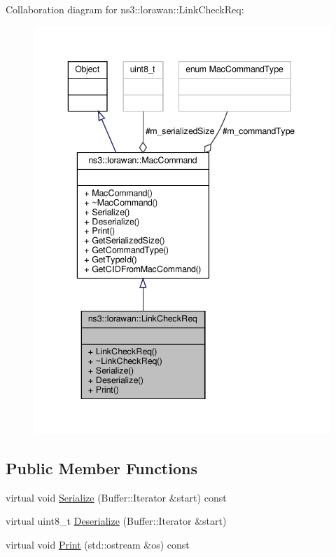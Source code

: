 Collaboration diagram for ns3\+:\+:lorawan\+:\+:Link\+Check\+Req\+:
\nopagebreak
\begin{figure}[H]
\begin{center}
\leavevmode
\includegraphics[width=343pt]{classns3_1_1lorawan_1_1LinkCheckReq__coll__graph}
\end{center}
\end{figure}
\subsection*{Public Member Functions}
\begin{DoxyCompactItemize}
\item 
virtual void \hyperlink{classns3_1_1lorawan_1_1LinkCheckReq_a1be81dab18f22e357719385bb1f9fc46}{Serialize} (Buffer\+::\+Iterator \&start) const
\item 
virtual uint8\+\_\+t \hyperlink{classns3_1_1lorawan_1_1LinkCheckReq_aa628b654164b72a55daaaa831e27166e}{Deserialize} (Buffer\+::\+Iterator \&start)
\item 
virtual void \hyperlink{classns3_1_1lorawan_1_1LinkCheckReq_aa3a4fd54a54699ca3ec15ce608008fc3}{Print} (std\+::ostream \&os) const
\end{DoxyCompactItemize}
